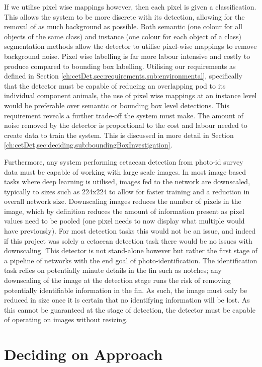  If we utilise pixel wise mappings however, then each pixel is given a classification. This allows the system to be more discrete with its detection, allowing for the removal of as much background as possible. Both semantic (one colour for all objects of the same class) and instance (one colour for each object of a class) segmentation methods allow the detector to utilise pixel-wise mappings to remove background noise. Pixel wise labelling is far more labour intensive and costly to produce compared to bounding box labelling. Utilising our requirements as defined in Section \ref{ch:cetDet,sec:requirements,sub:environmental}, specifically that the detector must be capable of reducing an overlapping pod to its individual component animals, the use of pixel wise mappings at an instance level would be preferable over semantic or bounding box level detections. This requirement reveals a further trade-off the system must make. The amount of noise removed by the detector is proportional to the cost and labour needed to create data to train the system. This is discussed in more detail in Section \ref{ch:cetDet,sec:deciding,sub:boundingBoxInvestigation}.
 
 Furthermore, any system performing cetacean detection from photo-id survey data must be capable of working with large scale images. In most image based tasks where deep learning is utilised, images fed to the network are downscaled, typically to sizes such as 224x224 to allow for faster training and a reduction in overall network size. Downscaling images reduces the number of pixels in the image, which by definition reduces the amount of information present as pixel values need to be pooled (one pixel needs to now display what multiple would have previously). For most detection tasks this would not be an issue, and indeed if this project was solely a cetacean detection task there would be no issues with downscaling. This detector is not stand-alone however but rather the first stage of a pipeline of networks with the end goal of photo-identification. The identification task relies on potentially minute details in the fin such as notches; any downscaling of the image at the detection stage runs the risk of removing potentially identifiable information in the fin. As such, the image must only be reduced in size once it is certain that no identifying information will be lost. As this cannot be guaranteed at the stage of detection, the detector must be capable of operating on images without resizing.
 
\section{Deciding on Approach}\label{ch:cetDet,sec:deciding}

